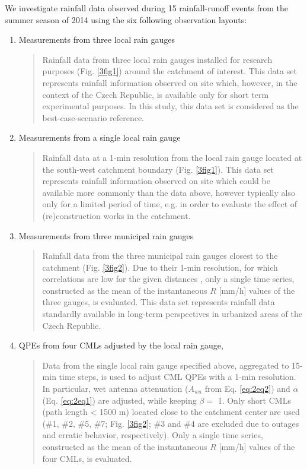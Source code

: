 \documentclass{ctuthesis}\usepackage[]{graphicx}\usepackage[]{color}
\begin{document}
We investigate rainfall data observed during 15 rainfall-runoff events from the summer season of 2014 using the six following observation layouts: 
\begin{enumerate}
        \item Measurements from three local rain gauges
                \begin{quote}
                Rainfall data from three local rain gauges installed for research purposes (Fig. \ref{3fig1}) around the catchment of interest. 
                This data set represents rainfall information observed on site which, however, in the context of the Czech Republic, is available only for short term experimental purposes. In this study, this data set is considered as the best-case-scenario reference.
                \end{quote}
        \item Measurements from a single local rain gauge 
                \begin{quote}
                Rainfall data at a 1-min resolution from the local rain gauge located at the south-west catchment boundary (Fig. \ref{3fig1}).
                This data set represents rainfall information observed on site which could be available more commonly than the data above, however typically also only for a limited period of time, e.g. in order to evaluate the effect of (re)construction works in the catchment.
                \end{quote}
         \item Measurements from three municipal rain gauges
                \begin{quote}
                Rainfall data from the three municipal rain gauges closest to the catchment (Fig. \ref{3fig2}). Due to their 1-min resolution, for which correlations are low for the given distances \citep{villariniRainfallSamplingUncertainties2008}, only a  single time series, constructed as the mean of the instantaneous $R$ [mm/h] values of the three gauges, is evaluated.
                This data set represents rainfall data standardly available in long-term perspectives in urbanized areas of the Czech Republic.
                \end{quote}
        \item QPEs from four CMLs adjusted by the local rain gauge, 
                \begin{quote}
                Data from the single local rain gauge specified above, aggregated to 15-min time steps, is used to adjust \citep{fenclGaugeadjustedRainfallEstimates2017} CML QPEs with a 1-min resolution. In particular, wet antenna attenuation ($A_{wa}$ from Eq. \ref{eq:2eq2}) and $\alpha$ (Eq. \ref{eq:2eq1}) are adjusted, while keeping $\beta =$ 1. Only short CMLs (path length < 1500 m) located close to the catchment center are used (\#1, \#2, \#5, \#7; Fig. \ref{3fig2}; \#3 and \#4 are excluded due to outages and erratic behavior, respectively). Only a single time series, constructed as the mean of the instantaneous $R$ [mm/h] values of the four CMLs, is evaluated.

\end{quote}
\end{enumerate}
\end{document}
